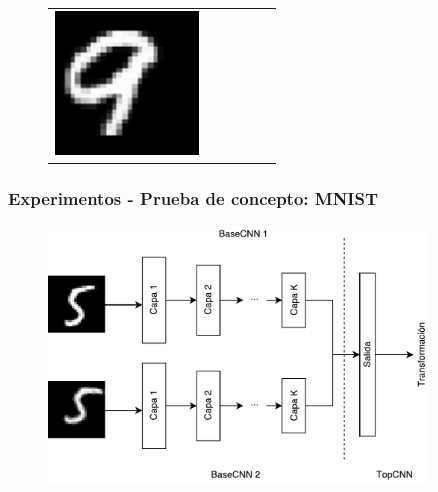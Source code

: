 \documentclass{beamer}
\begin{document}
\begin{frame}
\begin{figure}
{\begin{tabular}{cccccc}
\includegraphics[width = 1.5in]{./images/mnist/c1.png}\\
\end{tabular}
}
\label{fig:mnist-sample}
\end{figure}

\end{frame}




\begin{frame}[plain]
\frametitle{Experimentos - Prueba de concepto: MNIST}
\begin{figure}
    \centering
    \includegraphics[width=0.9\textwidth]{images/siamese-example.pdf}
\end{figure}
\end{frame}
\end{document}
